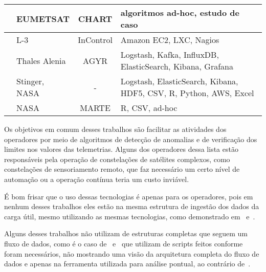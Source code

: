 \begin{table}[htbp]
\begin{center}
\begin{tabular}{|C{8em}|C{6em}|c|C{10em}|}
			\cite{trollopeAnalysisAutomatedTechniques2018} & EUMETSAT           & CHART                & algoritmos ad-hoc, estudo de caso                                                    \\
			\hline
			\cite{gillesFlyingLargeConstellations2016}     & L-3                & InControl            & Amazon EC2, LXC, Nagios                                                              \\
			\hline
			\cite{hennionBigdataSatelliteYearly2018}       & Thales Alenia      & AGYR                 & Logstash, Kafka, InfluxDB, ElasticSearch, Kibana, Grafana                            \\
			\hline
			\cite{mateikUsingBigData2017}                  & Stinger, NASA      & -                    & Logstash, ElasticSearch, Kibana, HDF5, CSV, R, Python, AWS, Excel                    \\
			\hline
			\cite{fernandezTelemetryAnomalyDetection2017}  & NASA               & MARTE                & R, CSV, ad-hoc                                                                       \\
			\hline
		\end{tabular}
	\end{center}
	\label{table:bigdataoperators}
\end{table}

Os objetivos em comum desses trabalhos são facilitar as atividades dos operadores por meio de algoritmos de detecção de anomalias e de verificação dos limites nos valores das telemetrias.
Alguns dos operadores dessa lista estão responsáveis pela operação de constelações de satélites complexos, como constelações de sensoriamento remoto, que faz necessário um certo nível de automação ou a operação contínua teria um custo inviável.

É bom frisar que o uso dessas tecnologias é apenas para os operadores, pois em nenhum desses trabalhos eles estão na mesma estrutura de ingestão dos dados da carga útil, mesmo utilizando as mesmas tecnologias, como demonstrado em~\cite{mateikUsingBigData2017} e~\cite{adamskiDataAnalyticsLarge2016}.

Alguns desses trabalhos não utilizam de estruturas completas que seguem um fluxo de dados, como é o caso de~\cite{fernandezTelemetryAnomalyDetection2017} e~\cite{trollopeAnalysisAutomatedTechniques2018} que utilizam de scripts feitos conforme foram necessários, não mostrando uma visão da arquitetura completa do fluxo de dados e apenas na ferramenta utilizada para análise pontual, ao contrário de~\cite{yvernesCopernicusGroundSegment2018}.

